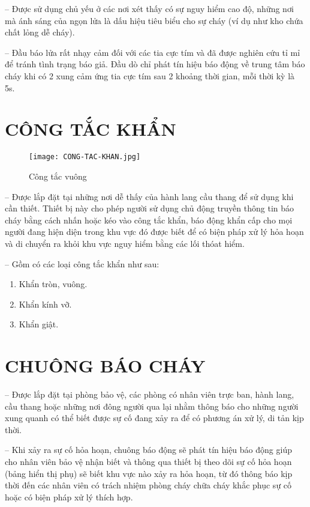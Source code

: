 -- Được sử dụng chủ yếu ở các nơi xét thấy có sự nguy hiểm cao độ, những nơi mà ánh sáng của ngọn lửa là dấu hiệu tiêu biểu cho sự cháy (ví dụ như kho chứa chất lỏng dễ cháy).

-- Đầu báo lửa rất nhạy cảm đối với các tia cực tím và đã được nghiên cứu tỉ mỉ để tránh tình trạng báo giả. Đầu dò chỉ phát tín hiệu báo động về trung tâm báo cháy khi có 2 xung cảm ứng tia cực tím sau 2 khoảng thời gian, mỗi thời kỳ là 5s.

\break
\section{CÔNG TẮC KHẨN}
\begin{wrapfigure}[10]{l}{0.4\textwidth}
	\vspace{-1cm}
	\centering
	\texttt{[image: CONG-TAC-KHAN.jpg]}
	\caption{Công tắc vuông}
\end{wrapfigure}

-- Được lắp đặt tại những nơi dễ thấy của hành lang cầu thang để sử dụng khi cần thiết. Thiết bị này cho phép người sử dụng chủ động truyền thông tin báo cháy bằng cách nhấn hoặc kéo vào công tắc khẩn, báo động khẩn cấp cho mọi người đang hiện diện trong khu vực đó được biết để có biện pháp xử lý hỏa hoạn và di chuyển ra khỏi khu vực nguy hiểm bằng các lối thóat hiểm.

-- Gồm có các loại công tắc khẩn như sau:
\begin{enumerate}[leftmargin=2.2cm]
	\item Khẩn tròn, vuông.
	\item Khẩn kính vỡ.
	\item Khẩn giật.
\end{enumerate}

\section{CHUÔNG BÁO CHÁY}
-- Được lắp đặt tại phòng bảo vệ, các phòng có nhân viên trực ban, hành lang, cầu thang hoặc những nơi đông người qua lại nhằm thông báo cho những người xung quanh có thể biết được sự cố đang xảy ra để có phương án xử lý, di tản kịp thời.

-- Khi xảy ra sự cố hỏa hoạn, chuông báo động sẽ phát tín hiệu báo động giúp cho nhân viên bảo vệ nhận biết và thông qua thiết bị theo dõi sự cố hỏa hoạn (bảng hiển thị phụ) sẽ biết khu vực nào xảy ra hỏa hoạn, từ đó thông báo kịp thời đến các nhân viên có trách nhiệm phòng cháy chữa cháy khắc phục sự cố hoặc có biện pháp xử lý thích hợp.

